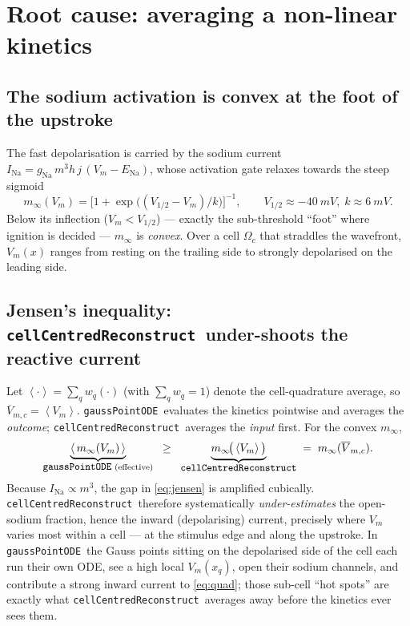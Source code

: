 \documentclass[11pt,a4paper]{article}
\newcommand{\Vm}{V_{m}}
\newcommand{\code}[1]{\texttt{\small #1}}
\newcommand{\gpode}{\code{gaussPointODE}}
\newcommand{\ccrec}{\code{cellCentredReconstruct}}
\newcommand{\Vbarc}{\overline{V}_{m,c}}
\newcommand{\avg}[1]{\left\langle #1 \right\rangle}
\newcommand{\Omegac}{\Omega_{c}}
\begin{document}
\section{Root cause: averaging a non-linear kinetics}

\subsection{The sodium activation is convex at the foot of the upstroke}

The fast depolarisation is carried by the sodium current
$I_{\mathrm{Na}}=g_{\mathrm{Na}}\,m^{3}h\,j\,(\Vm-E_{\mathrm{Na}})$, whose
activation gate relaxes towards the steep sigmoid
\begin{equation}
  m_\infty(\Vm)=\Big[1+\exp\!\big((V_{1/2}-\Vm)/k\big)\Big]^{-1},
  \qquad V_{1/2}\approx\SI{-40}{mV},\; k\approx\SI{6}{mV}.
\end{equation}
Below its inflection ($\Vm<V_{1/2}$) --- exactly the sub-threshold ``foot'' where
ignition is decided --- $m_\infty$ is \emph{convex}. Over a cell $\Omegac$ that
straddles the wavefront, $\Vm(x)$ ranges from resting on the trailing side to
strongly depolarised on the leading side.

\subsection{Jensen's inequality: \ccrec\ under-shoots the reactive current}

Let $\avg{\cdot}=\sum_q w_q(\cdot)$ (with $\sum_q w_q=1$) denote the
cell-quadrature average, so $\Vbarc=\avg{\Vm}$. \gpode\ evaluates the kinetics pointwise and
averages the \emph{outcome}; \ccrec\ averages the \emph{input} first. For the
convex $m_\infty$,
\begin{equation}
  \underbrace{\avg{\,m_\infty(\Vm)\,}}_{\text{\gpode\ (effective)}}
  \;\;\ge\;\;
  \underbrace{m_\infty\!\big(\avg{\Vm}\big)}_{\text{\ccrec}}
  \;=\; m_\infty(\Vbarc).
  \label{eq:jensen}
\end{equation}
Because $I_{\mathrm{Na}}\propto m^{3}$, the gap in \eqref{eq:jensen} is amplified
cubically. \ccrec\ therefore systematically \emph{under-estimates} the open-sodium
fraction, hence the inward (depolarising) current, precisely where $\Vm$ varies
most within a cell --- at the stimulus edge and along the upstroke. In \gpode\ the
Gauss points sitting on the depolarised side of the cell each run their own ODE,
see a high local $\Vm(x_q)$, open their sodium channels, and contribute a strong
inward current to \eqref{eq:quad}; those sub-cell ``hot spots'' are exactly what
\ccrec\ averages away before the kinetics ever sees them.
\end{document}
